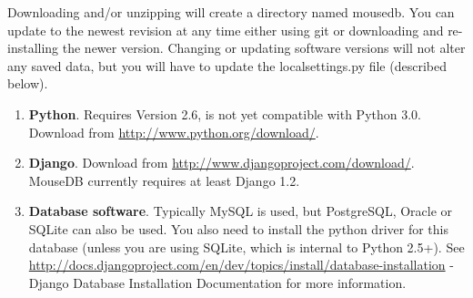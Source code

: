 \documentclass[letterpaper,10pt,english]{sphinxmanual}
\begin{document}
Downloading and/or unzipping will create a directory named mousedb.  You can update to the newest revision at any time either using git or downloading and re-installing the newer version.  Changing or updating software versions will not alter any saved data, but you will have to update the localsettings.py file (described below).
\begin{enumerate}
\item {} 
\textbf{Python}.  Requires Version 2.6, is not yet compatible with Python 3.0.  Download from \href{http://www.python.org/download/}{http://www.python.org/download/}.

\item {} 
\textbf{Django}.  Download from \href{http://www.djangoproject.com/download/}{http://www.djangoproject.com/download/}.  MouseDB currently requires at least Django 1.2.

\item {} 
\textbf{Database software}.  Typically MySQL is used, but PostgreSQL, Oracle or SQLite can also be used.  You also need to install the python driver for this database (unless you are using SQLite, which is internal to Python 2.5+).  See \href{http://docs.djangoproject.com/en/dev/topics/install/database-installation}{http://docs.djangoproject.com/en/dev/topics/install/database-installation} - Django Database Installation Documentation for more information.

\end{enumerate}
\end{document}
